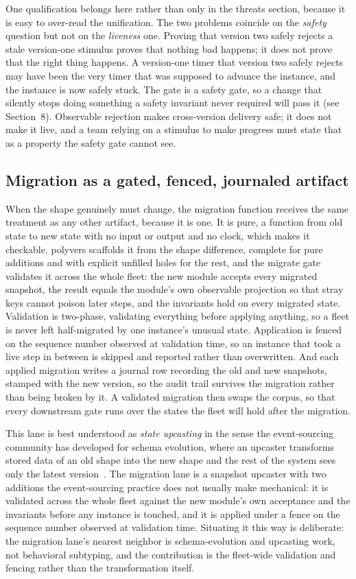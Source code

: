 \documentclass[11pt]{article}
\newcommand{\tool}[1]{\textsf{#1}}
\begin{document}
One qualification belongs here rather than only in the threats section, because
it is easy to over-read the unification. The two problems coincide on the
\emph{safety} question but not on the \emph{liveness} one. Proving that version
two safely rejects a stale version-one stimulus proves that nothing bad happens;
it does not prove that the right thing happens. A version-one timer that version
two safely rejects may have been the very timer that was supposed to advance the
instance, and the instance is now safely stuck. The gate is a safety gate, so a
change that silently stops doing something a safety invariant never required will
pass it (see Section~8). Observable rejection makes cross-version delivery safe;
it does not make it live, and a team relying on a stimulus to make progress must
state that as a property the safety gate cannot see.

\subsection{Migration as a gated, fenced, journaled artifact}

When the shape genuinely must change, the migration function receives the same
treatment as any other artifact, because it is one. It is pure, a function from
old state to new state with no input or output and no clock, which makes it
checkable. \tool{polyvers} scaffolds it from the shape difference, complete for
pure additions and with explicit unfilled holes for the rest, and the migrate
gate validates it across the whole fleet: the new module accepts every migrated
snapshot, the result equals the module's own observable projection so that stray
keys cannot poison later steps, and the invariants hold on every migrated state.
Validation is two-phase, validating everything before applying anything, so a
fleet is never left half-migrated by one instance's unusual state. Application
is fenced on the sequence number observed at validation time, so an instance
that took a live step in between is skipped and reported rather than overwritten.
And each applied migration writes a journal row recording the old and new
snapshots, stamped with the new version, so the audit trail survives the
migration rather than being broken by it. A validated migration then swaps the
corpus, so that every downstream gate runs over the states the fleet will hold
after the migration.

This lane is best understood as \emph{state upcasting} in the sense the
event-sourcing community has developed for schema evolution, where an upcaster
transforms stored data of an old shape into the new shape and the rest of the
system sees only the latest version~\cite{upcasting}. The migration lane is a
snapshot upcaster with two additions the event-sourcing practice does not
usually make mechanical: it is validated across the whole fleet against the new
module's own acceptance and the invariants before any instance is touched, and
it is applied under a fence on the sequence number observed at validation time.
Situating it this way is deliberate: the migration lane's nearest neighbor is
schema-evolution and upcasting work, not behavioral subtyping, and the
contribution is the fleet-wide validation and fencing rather than the
transformation itself.
\end{document}

